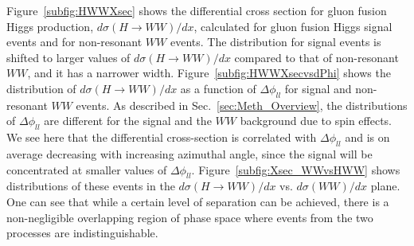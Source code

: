 \documentclass{cmspaper}
\begin{document}
Figure~\ref{subfig:HWWXsec} shows the differential cross section for gluon fusion Higgs production,
$d\sigma(H \rightarrow WW)/dx$, calculated for gluon fusion Higgs signal events and for non-resonant $WW$ events.
The distribution for signal events is shifted to larger values of  $d\sigma(H \rightarrow WW)/dx$ compared to that
of non-resonant $WW$, and it has a narrower width. 
Figure~\ref{subfig:HWWXsecvsdPhi} shows the distribution of $d\sigma(H \rightarrow WW)/dx$ as a function of
$\Delta\phi_{ll}$ for signal and non-resonant $WW$ events.
As described in Sec.~\ref{sec:Meth_Overview}, the distributions of $\Delta\phi_{ll}$ are different for the signal and the $WW$
background due to spin effects. We see here that the differential cross-section is correlated with $\Delta\phi_{ll}$ and is on average decreasing with
increasing azimuthal angle, since the signal will be concentrated at smaller values of $\Delta\phi_{ll}$.
Figure~\ref{subfig:Xsec_WWvsHWW} shows distributions of these events in the $d\sigma(H \rightarrow WW)/dx$ 
vs. $d\sigma(WW)/dx$ plane. One can see that while a certain level of separation can be achieved, there is a 
non-negligible overlapping region of phase space where events from the two processes are indistinguishable.
\end{document}
